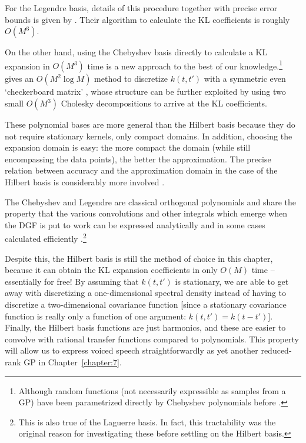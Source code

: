 \begin{chapterappendices}{5}
For the Legendre basis, details of this procedure together with precise error bounds is given by \cite{Greengard2021}.
Their algorithm to calculate the KL coefficients is roughly $O(M^3)$.

On the other hand, using the Chebyshev basis directly to calculate a KL expansion in $O(M^3)$ time is a new approach to the best of our knowledge.\footnote{%
Although random functions (not necessarily expressible as samples from a GP) have been parametrized directly by Chebyshev polynomials before \citep{Filip2019}.%
}
\cite{Scheiber2015} gives an $O(M^2\log M)$ method to discretize $k(t,t')$ with a symmetric even `checkerboard matrix' \citep{Jones2018}, whose structure can be further exploited by using two small $O(M^3)$ Cholesky decompositions to arrive at the KL coefficients.

These polynomial bases are more general than the Hilbert basis because they do not require stationary kernels, only compact domains.
In addition, choosing the expansion domain is easy: the more compact the domain (while still encompassing the data points), the better the approximation.
The precise relation between accuracy and the approximation domain in the case of the Hilbert basis is considerably more involved \citep{Riutort-Mayol2020}.

The Chebyshev and Legendre are classical orthogonal polynomials and share the property that the various convolutions and other integrals which emerge when the DGF is put to work can be expressed analytically and in some cases calculated efficiently \citep{Fokas2012, Dixit2014, Xu2017, Xu2018, Hale2014}.\footnote{%
This is also true of the Laguerre basis.
In fact, this tractability was the original reason for investigating these before settling on the Hilbert basis.
}

Despite this, the Hilbert basis is still the method of choice in this chapter, because it can obtain the KL expansion coefficients in only $O(M)$ time -- essentially for free!
By assuming that $k(t,t')$ is stationary, we are able to get away with discretizing a one-dimensional spectral density instead of having to discretize a two-dimensional covariance function [since a stationary covariance function is really only a function of one argument: $k(t,t') = k(t - t')$].
Finally, the Hilbert basis functions are just harmonics, and these are easier to convolve with rational transfer functions compared to polynomials.
This property will allow us to express voiced speech straightforwardly as yet another reduced-rank GP in Chapter~\ref{chapter:7}.


\end{chapterappendices}

